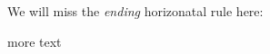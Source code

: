\begin{pages}
\begin{Leftside}
\beginnumbering
\pstart
We will miss the \emph{ending}
horizonatal rule here:

\pend
\endnumbering
\end{Leftside}
\begin{Rightside}
\beginnumbering
\endnumbering
\end{Rightside}
\end{pages}
\Pages
more text

